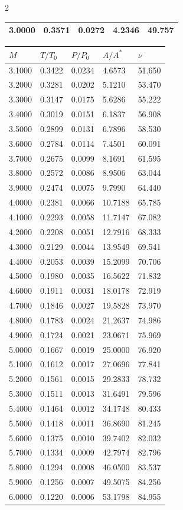 \begin{multicols}{2}
\begin{tabular}{|l|l|l|l|l|}
3.0000&0.3571&0.0272& 4.2346&49.757\\\hline
 \end{tabular}
 \begin{tabular}{|l|l|l|l|l|}
 \hline
 $M$ & $T/T_0$ & $P/P_0$ & $A/A^*$ & $\nu$\\\hline
3.1000&0.3422&0.0234& 4.6573&51.650\\\hline
3.2000&0.3281&0.0202& 5.1210&53.470\\\hline
3.3000&0.3147&0.0175& 5.6286&55.222\\\hline
3.4000&0.3019&0.0151& 6.1837&56.908\\\hline
3.5000&0.2899&0.0131& 6.7896&58.530\\\hline
3.6000&0.2784&0.0114& 7.4501&60.091\\\hline
3.7000&0.2675&0.0099& 8.1691&61.595\\\hline
3.8000&0.2572&0.0086& 8.9506&63.044\\\hline
3.9000&0.2474&0.0075& 9.7990&64.440\\\hline
4.0000&0.2381&0.0066&10.7188&65.785\\\hline
4.1000&0.2293&0.0058&11.7147&67.082\\\hline
4.2000&0.2208&0.0051&12.7916&68.333\\\hline
4.3000&0.2129&0.0044&13.9549&69.541\\\hline
4.4000&0.2053&0.0039&15.2099&70.706\\\hline
4.5000&0.1980&0.0035&16.5622&71.832\\\hline
4.6000&0.1911&0.0031&18.0178&72.919\\\hline
4.7000&0.1846&0.0027&19.5828&73.970\\\hline
4.8000&0.1783&0.0024&21.2637&74.986\\\hline
4.9000&0.1724&0.0021&23.0671&75.969\\\hline
5.0000&0.1667&0.0019&25.0000&76.920\\\hline
5.1000&0.1612&0.0017&27.0696&77.841\\\hline
5.2000&0.1561&0.0015&29.2833&78.732\\\hline
5.3000&0.1511&0.0013&31.6491&79.596\\\hline
5.4000&0.1464&0.0012&34.1748&80.433\\\hline
5.5000&0.1418&0.0011&36.8690&81.245\\\hline
5.6000&0.1375&0.0010&39.7402&82.032\\\hline
5.7000&0.1334&0.0009&42.7974&82.796\\\hline
5.8000&0.1294&0.0008&46.0500&83.537\\\hline
5.9000&0.1256&0.0007&49.5075&84.256\\\hline
6.0000&0.1220&0.0006&53.1798&84.955\\\hline
 \end{tabular}
 \end{multicols}
 
